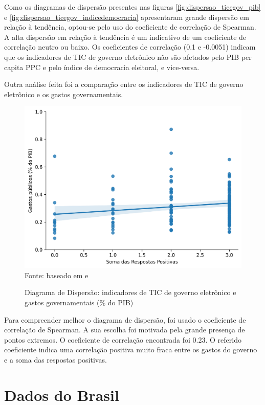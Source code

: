 Como os diagramas de dispersão presentes nas figuras \ref{fig:dispersao_ticegov_pib} e \ref{fig:dispersao_ticegov_indicedemocracia}  apresentaram grande dispersão em relação à tendência, optou-se pelo uso do coeficiente de correlação de Spearman. A alta dispersão em relação à tendência é um indicativo de um coeficiente de correlação neutro ou baixo. Os coeficientes de correlação (0.1 e -0.0051) indicam que os indicadores de TIC de governo eletrônico não são afetados pelo PIB per capita PPC e pelo índice de democracia eleitoral, e vice-versa.

Outra análise feita foi a comparação entre os indicadores de TIC de governo eletrônico e os gastos governamentais.

\begin{figure}[H]
	\centering
	\caption{Diagrama de Dispersão: indicadores de TIC de governo eletrônico e gastos governamentais (\% do PIB)}
	\includegraphics[width=1\linewidth]{figuras/egdi/dispersao_ticegov_govexpenditure}
	\label{fig:dispersao_ticegov_govexpenditure}
	\footnotesize{Fonte: baseado em \cite{FMI_gov_expenditure} e \cite{ONU_ICT_in_government_indicators}}
\end{figure}

Para compreender melhor o diagrama de dispersão, foi usado o coeficiente de correlação de Spearman. A sua escolha foi motivada pela grande presença de pontos extremos. O coeficiente de correlação encontrada foi 0.23. O referido coeficiente indica uma correlação positiva muito fraca entre os gastos do governo e a soma das respostas positivas. 


\section{Dados do Brasil}

